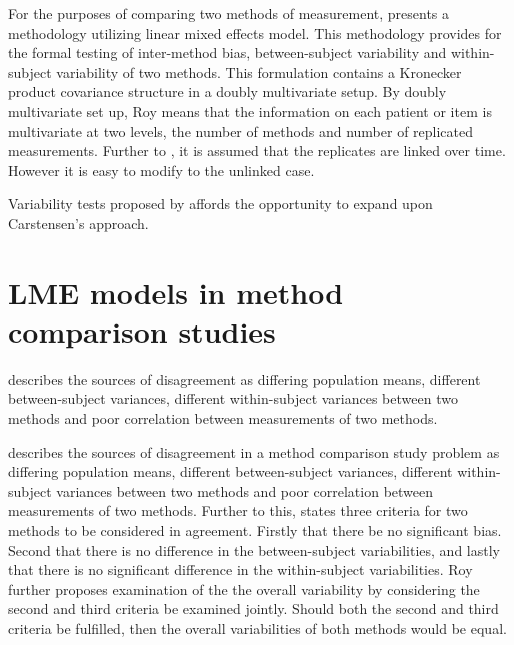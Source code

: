 \documentclass[12pt, a4paper]{report}
\theoremstyle{plain}
\theoremstyle{definition}
\theoremstyle{remark}
\begin{document}
For the purposes of comparing two methods of measurement, \citet{ARoy2009} presents a methodology utilizing linear mixed effects model. This methodology provides for the formal testing of inter-method bias, between-subject variability and within-subject variability of two methods. This formulation contains a Kronecker product covariance structure in a doubly multivariate setup. By doubly multivariate set up, Roy means that the information on each patient or item is multivariate at two levels, the number of methods and number of replicated measurements. Further to \citet{lam}, it is assumed that the replicates are linked over time. However it is easy to modify to the unlinked case.


\bigskip
Variability tests proposed by \citet{ARoy2009} affords the opportunity to expand upon Carstensen's approach.


		\section{LME models in method comparison studies}
		\citet{Barnhart}  describes the sources of disagreement as
		differing population means, different between-subject variances,
		different within-subject variances between two methods and poor
		correlation between measurements of two methods.

		
	
		
	\citet{Barnhart} describes the sources of disagreement in a method comparison study problem as
	differing population means, different between-subject variances, different within-subject variances between two methods and poor
	correlation between measurements of two methods. Further to this, \citet{ARoy2009} states three criteria for two methods to be considered in agreement. Firstly that there be no significant bias. Second that there is no difference in the between-subject variabilities, and lastly that there is no significant difference in the within-subject variabilities. 	Roy further proposes examination of the the overall variability by considering the second and third criteria be examined jointly. Should both the second and third criteria be fulfilled, then the overall variabilities of both methods would be equal.
	
\end{document}
